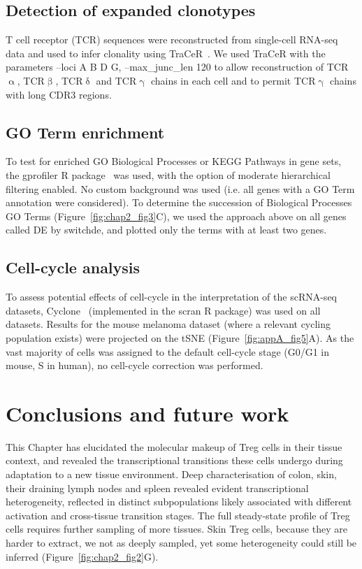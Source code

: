 \subsection{Detection of expanded clonotypes}
T cell receptor (TCR) sequences were reconstructed from single-cell RNA-seq data and used to infer clonality using TraCeR~\citep{stubbington_t_2016}. We used TraCeR with the parameters --loci A B D G, --max\_junc\_len 120 to allow reconstruction of TCR${\upalpha}$, TCR${\upbeta}$, TCR${\updelta}$ and TCR${\upgamma}$ chains in each cell and to permit TCR${\upgamma}$ chains with long CDR3 regions. 

\subsection{GO Term enrichment}
To test for enriched GO Biological Processes or KEGG Pathways in gene sets, the gprofiler R package~\citep{Reimand2016-fj} was used, with the option of moderate hierarchical filtering enabled. No custom background was used (i.e. all genes with a GO Term annotation were considered).
To determine the succession of Biological Processes GO Terms (Figure~\ref{fig:chap2_fig3}C), we used the approach above on all genes called DE by switchde, and plotted only the terms with at least two genes.

\subsection{Cell-cycle analysis}
To assess potential effects of cell-cycle in the interpretation of the scRNA-seq datasets, Cyclone~\citep{Scialdone2015-tw} (implemented in the scran R package) was used on all datasets. Results for the mouse melanoma dataset (where a relevant cycling population exists) were projected on the tSNE (Figure~\ref{fig:appA_fig5}A). As the vast majority of cells was assigned to the default cell-cycle stage (G0/G1 in mouse, S in human), no cell-cycle correction was performed.


\section{Conclusions and future work}
\label{section_2.conc}

This Chapter has elucidated the molecular makeup of Treg cells in their tissue context, and revealed the transcriptional transitions these cells undergo during  adaptation to a new tissue environment. Deep characterisation of colon, skin, their draining lymph nodes and spleen revealed evident transcriptional heterogeneity, reflected in distinct subpopulations likely associated with different activation and cross-tissue transition stages. The full steady-state profile of Treg cells requires further sampling of more tissues. Skin Treg cells, because they are harder to extract, we not as deeply sampled, yet some heterogeneity could still be inferred (Figure~\ref{fig:chap2_fig2}G).

